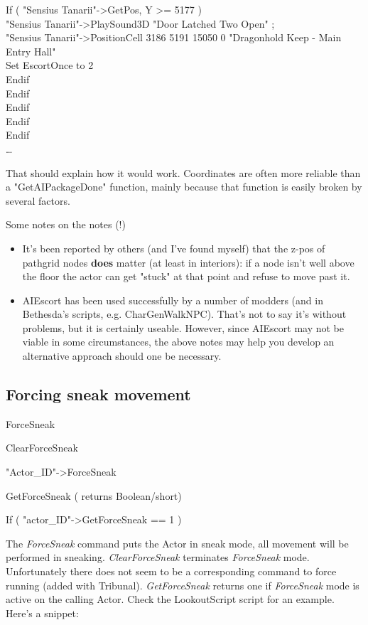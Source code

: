 \documentclass[
]{article}
\begin{document}
If ( "Sensius Tanarii"-\textgreater GetPos, Y \textgreater= 5177 )\\
"Sensius Tanarii"-\textgreater PlaySound3D "Door Latched Two Open" ;\\
"Sensius Tanarii"-\textgreater PositionCell 3186 5191 15050 0
"Dragonhold Keep - Main Entry Hall"\\
Set EscortOnce to 2\\
Endif\\
Endif\\
Endif\\
Endif\\
Endif\\
\ldots{}

That should explain how it would work. Coordinates are often more
reliable than a "GetAIPackageDone" function, mainly because that
function is easily broken by several factors.

Some notes on the notes (!)

\begin{itemize}
\item
  It's been reported by others (and I've found myself) that the z-pos of
  pathgrid nodes \textbf{does} matter (at least in interiors): if a node
  isn't well above the floor the actor can get "stuck" at that point and
  refuse to move past it.
\item
  AIEscort has been used successfully by a number of modders (and in
  Bethesda's scripts, e.g. CharGenWalkNPC). That's not to say it's
  without problems, but it is certainly useable. However, since AIEscort
  may not be viable in some circumstances, the above notes may help you
  develop an alternative approach should one be necessary.
\end{itemize}

\hypertarget{forcing-sneak-movement}{%
\subsection{Forcing sneak movement}\label{forcing-sneak-movement}}

ForceSneak

ClearForceSneak

"Actor\_ID"-\textgreater ForceSneak

GetForceSneak ( returns Boolean/short)

If ( "actor\_ID"-\textgreater GetForceSneak == 1 )

The \emph{ForceSneak} command puts the Actor in sneak mode, all movement
will be performed in sneaking. \emph{ClearForceSneak} terminates
\emph{ForceSneak} mode. Unfortunately there does not seem to be a
corresponding command to force running (added with Tribunal).
\emph{GetForceSneak} returns one if \emph{ForceSneak} mode is active on
the calling Actor. Check the LookoutScript script for an example. Here's
a snippet:
\end{document}
